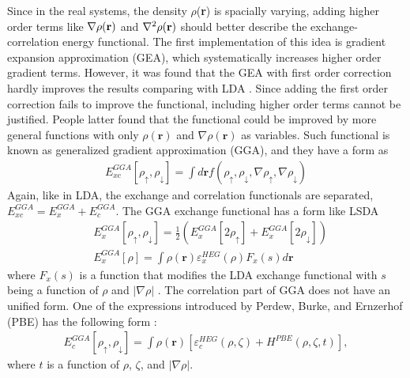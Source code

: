 Since in the real systems, the density $\rho$({\bf r}) is spacially varying, adding higher order terms like $\nabla \rho({\bf r})$ and $\nabla^2 \rho({\bf r})$ should better describe the exchange-correlation energy functional. The first implementation of this idea is gradient expansion approximation (GEA), which systematically increases higher order gradient terms. However, it was found that the GEA with first order correction hardly improves the results comparing with LDA \cite{perdew1996generalized}. Since adding the first order correction fails to improve the functional, including higher order terms cannot be justified. People latter found that the functional could be improved by more general functions with only $\rho(\textbf{r})$ and $\nabla \rho(\textbf{r})$ as variables. Such functional is known as generalized gradient approximation (GGA), and they have a form as
	\begin{equation}
	\begin{aligned}
        E_{xc}^{GGA}[\rho_{\uparrow}, \rho_{\downarrow}] = \int d\textbf{r} f(\rho_{\uparrow},\rho_{\downarrow}, \nabla \rho_{\uparrow}, \nabla \rho_{\downarrow})
    \end{aligned}
	\end{equation}
Again, like in LDA, the exchange and correlation functionals are separated, $E_{xc}^{GGA} = E_{x}^{GGA} + E_{c}^{GGA}$. The GGA exchange functional has a form like LSDA
	\begin{equation}
	\begin{aligned}
        &E_{x}^{GGA}[\rho_{\uparrow}, \rho_{\downarrow}] = \frac{1}{2} (E_{x}^{GGA}[2\rho_{\uparrow}]  + E_{x}^{GGA}[2\rho_{\downarrow}] ) \\
        &E_x^{GGA}[\rho] = \int \rho(\textbf{r}) \varepsilon_{x}^{HEG}(\rho) F_x(s) d\textbf{r}
    \end{aligned}
	\end{equation}
where $F_x(s)$ is a function that modifies the LDA exchange functional with $s$ being a function of $\rho$ and $|\nabla \rho|$ \cite{perdew1996generalized}.
The correlation part of GGA does not have an unified form. One of the expressions introduced by Perdew, Burke, and Ernzerhof (PBE) has the following form \cite{perdew1996generalized}:
	\begin{equation}
	\begin{aligned}
        E_c^{GGA}[\rho_{\uparrow},\rho_{\downarrow}] = \int \rho(\textbf{r})  \left[ \varepsilon_{c}^{HEG} (\rho, \zeta) + H^{PBE} (\rho, \zeta, t) \right],
    \end{aligned}
	\end{equation}
where $t$ is a function of $\rho$, $\zeta$, and $|\nabla \rho|$.

